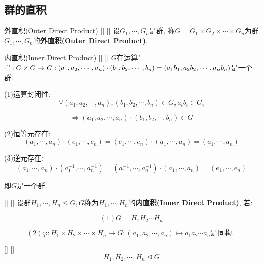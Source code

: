 \documentclass[UTF8]{ctexart}
\begin{document}
	\subsection{群的直积}
	
		\begin{dfn}
            []
            {外直积(Outer Direct Product)}
            []
            []
			设$G_1,\cdots,G_n$是群, 称$G=G_1\times G_2\times\cdots\times G_n$为群$G_1,\cdots,G_n$的\textbf{外直积(Outer Direct Product)}. 
		\end{dfn}
		
		\begin{ppt}
            []
            {内直积(Inner Direct Product)}
            []
            []
			$G$在运算"$\cdot":G\times G\to G: (a_1,a_2,\cdots,a_n)\cdot(b_1,b_2,\cdots,b_n)=(a_1b_1,a_2b_2,\cdots,a_nb_n)$是一个群. 
		\end{ppt}
		
	\begin{prf} 
			
			(1)运算封闭性: $$\forall (a_1,a_2,\cdots,a_n),(b_1,b_2,\cdots,b_n)\in G, a_ib_i\in G_i$$
			
			$$\Longrightarrow (a_1,a_2,\cdots,a_n)\cdot(b_1,b_2,\cdots,b_n)\in G$$
			
			(2)恒等元存在: $$(a_1,\cdots,a_n)\cdot(e_1,\cdots,e_n)=(e_1,\cdots,e_n)\cdot(a_1,\cdots,a_n)=(a_1,\cdots,a_n)$$
			
			(3)逆元存在: $$(a_1,\cdots,a_n)\cdot(a_1^{-1},\cdots,a_n^{-1})=(a_1^{-1},\cdots,a_n^{-1})\cdot(a_1,\cdots,a_n)=(e_1,\cdots,e_n)$$
			
			即$G$是一个群. 
	\end{prf}
 
		\begin{dfn}
            []
            {}
            []
            []
			设群$H_1,\cdots,H_n\leq G, G$称为$H_1,\cdots,H_n$的\textbf{内直积(Inner Direct Product)}, 若: 
			
			\[(1)G=H_1H_2\cdots H_n\]
			
			\[(2)\varphi: H_1\times H_2\times\cdots\times H_n\to G: (a_1,a_2,\cdots,a_n)\mapsto a_1a_2\cdots a_n\text{是同构. }\]
		\end{dfn}
		
		\begin{ppt}
            []
            {}
            []
            []
			$$H_1,H_2,\cdots,H_n\trianglelefteq G$$
		\end{ppt}
		
\end{document}
